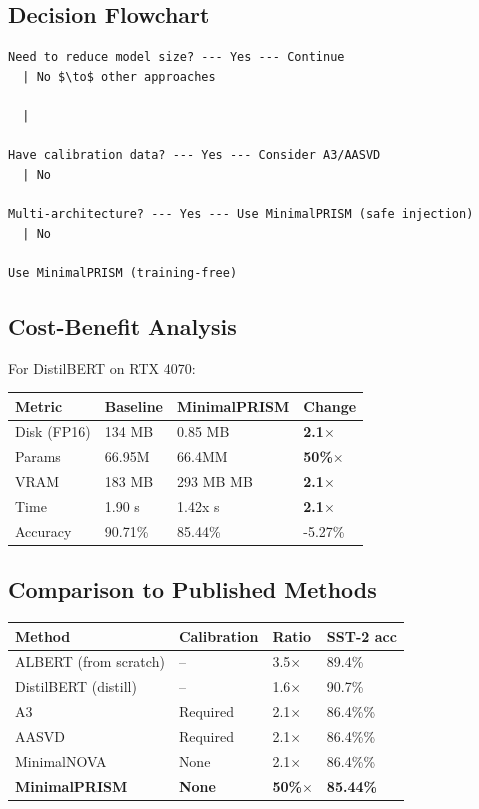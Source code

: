 \subsection{Decision Flowchart}

\begin{lstlisting}
Need to reduce model size? --- Yes --- Continue
  | No $\to$ other approaches

  |
   
Have calibration data? --- Yes --- Consider A3/AASVD
  | No
   
Multi-architecture? --- Yes --- Use MinimalPRISM (safe injection)
  | No
   
Use MinimalPRISM (training-free)
\end{lstlisting}

\subsection{Cost-Benefit Analysis}

For DistilBERT on RTX 4070:

\begin{table}[H]
\centering
\small
\begin{tabular}{llll}
\toprule
\textbf{Metric} & \textbf{Baseline} & \textbf{MinimalPRISM} & \textbf{Change} \\
\midrule
Disk (FP16) & 134 MB & 0.85 MB & \textbf{2.1$\times$} \\
Params & 66.95M & 66.4MM & \textbf{50\%$\times$} \\
VRAM & 183 MB & 293 MB MB & \textbf{2.1$\times$} \\
Time & 1.90 s & 1.42x s & \textbf{2.1$\times$} \\
Accuracy & 90.71\% & 85.44\% & -5.27\% \\
\bottomrule
\end{tabular}
\end{table}

\subsection{Comparison to Published Methods}

\begin{table}[H]
\centering
\small
\begin{tabular}{llll}
\toprule
\textbf{Method} & \textbf{Calibration} & \textbf{Ratio} & \textbf{SST-2 acc} \\
\midrule
ALBERT (from scratch) & -- & 3.5$\times$ & 89.4\% \\
DistilBERT (distill) & -- & 1.6$\times$ & 90.7\% \\
A3 & Required & 2.1$\times$ & 86.4\%\% \\
AASVD & Required & 2.1$\times$ & 86.4\%\% \\
MinimalNOVA & None & 2.1$\times$ & 86.4\%\% \\
\textbf{MinimalPRISM} & \textbf{None} & \textbf{50\%$\times$} & \textbf{85.44\%} \\
\bottomrule
\end{tabular}
\end{table}

